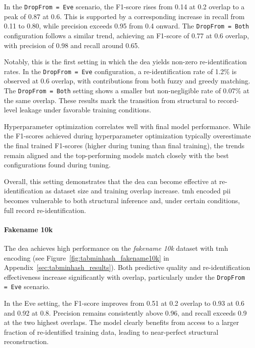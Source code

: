 In the \texttt{DropFrom = Eve} scenario, the F1-score rises from 0.14 at 0.2 overlap to a peak of 0.87 at 0.6.
This is supported by a corresponding increase in recall from 0.11 to 0.80, while precision exceeds 0.95 from 0.4 onward.
The \texttt{DropFrom = Both} configuration follows a similar trend, achieving an F1-score of 0.77 at 0.6 overlap, with precision of 0.98 and recall around 0.65.

Notably, this is the first setting in which the \ac{dea} yields non-zero re-identification rates.
In the \texttt{DropFrom = Eve} configuration, a re-identification rate of 1.2\% is observed at 0.6 overlap, with contributions from both fuzzy and greedy matching.
The \texttt{DropFrom = Both} setting shows a smaller but non-negligible rate of 0.07\% at the same overlap.
These results mark the transition from structural to record-level leakage under favorable training conditions.

Hyperparameter optimization correlates well with final model performance.
While the F1-scores achieved during hyperparameter optimization typically overestimate the final trained F1-scores (higher during tuning than final training), the trends remain aligned and the top-performing models match closely with the best configurations found during tuning.

Overall, this setting demonstrates that the \ac{dea} can become effective at re-identification as dataset size and training overlap increase.
\ac{tmh} encoded \ac{pii} becomes vulnerable to both structural inference and, under certain conditions, full record re-identification.


\paragraph{Fakename 10k}

The \ac{dea} achieves high performance on the \textit{fakename 10k} dataset with \ac{tmh} encoding (see Figure~\ref{fig:tabminhash_fakename10k} in Appendix~\ref{sec:tabminhash_results}).
Both predictive quality and re-identification effectiveness increase significantly with overlap, particularly under the \texttt{DropFrom = Eve} scenario.

In the Eve setting, the F1-score improves from 0.51 at 0.2 overlap to 0.93 at 0.6 and 0.92 at 0.8.
Precision remains consistently above 0.96, and recall exceeds 0.9 at the two highest overlaps.
The model clearly benefits from access to a larger fraction of re-identified training data, leading to near-perfect structural reconstruction.

